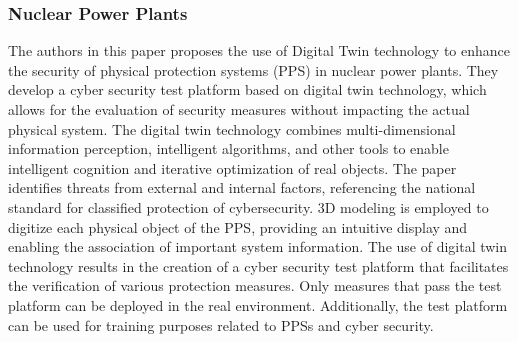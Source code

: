 \subsubsection*{Nuclear Power Plants}
The authors in this \cite{guoCyberSecurityRisk2021a} paper proposes the use of Digital Twin technology to enhance the security of physical protection systems (PPS) in nuclear power plants. They develop a cyber security test platform based on digital twin technology, which allows for the evaluation of security measures without impacting the actual physical system. The digital twin technology combines multi-dimensional information perception, intelligent algorithms, and other tools to enable intelligent cognition and iterative optimization of real objects. The paper identifies threats from external and internal factors, referencing the national standard for classified protection of cybersecurity. 3D modeling is employed to digitize each physical object of the PPS, providing an intuitive display and enabling the association of important system information. The use of digital twin technology results in the creation of a cyber security test platform that facilitates the verification of various protection measures. Only measures that pass the test platform can be deployed in the real environment. Additionally, the test platform can be used for training purposes related to PPSs and cyber security.